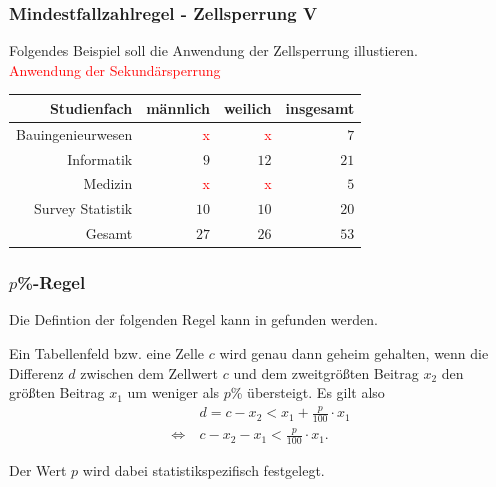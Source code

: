 \documentclass[aspectratio=169]{beamer}
\begin{document}
\begin{frame}
    \frametitle{Mindestfallzahlregel - Zellsperrung V}
    Folgendes Beispiel soll die Anwendung der Zellsperrung illustieren. \\
    \textcolor{red}{Anwendung der Sekundärsperrung}
    \begin{center}
        \begin{tabular}{ r r r r }
         \textbf{Studienfach} \vline & \textbf{männlich} & \textbf{weilich} & \textbf{insgesamt} \\ 
         \hline
         Bauingenieurwesen \vline & \textcolor{red}{x} & \textcolor{red}{x} & $7$ \\
         Informatik \vline & $9$ & $12$ & $21$ \\  
         Medizin \vline & \textcolor{red}{x} & \textcolor{red}{x} & $5$ \\
         Survey Statistik \vline & $10$ & $10$ & $20$ \\
         \hline
         Gesamt \vline & $27$ & $26$ & $53$
        \end{tabular}
    \end{center}
\end{frame}


\begin{frame}
    \frametitle{$p$\%-Regel}
    Die Defintion der folgenden Regel kann in \cite{Rothe-2} gefunden werden.
    \begin{theorem}[$p$\%-Regel]
        Ein Tabellenfeld bzw. eine Zelle $c$ wird genau dann geheim gehalten, wenn die Differenz $d$ zwischen dem Zellwert $c$ und dem zweitgrößten Beitrag $x_2$ den größten Beitrag $x_1$ um weniger als $p$\% übersteigt. Es gilt also 
        \begin{align}
            & d = c - x_2 < x_1 + \frac{p}{100} \cdot x_1 \\
            \Leftrightarrow \: & c - x_2 - x_ 1 <  \frac{p}{100} \cdot x_1.
        \end{align}
    \end{theorem}
    Der Wert $p$ wird dabei statistikspezifisch festgelegt.
\end{frame}
\end{document}
